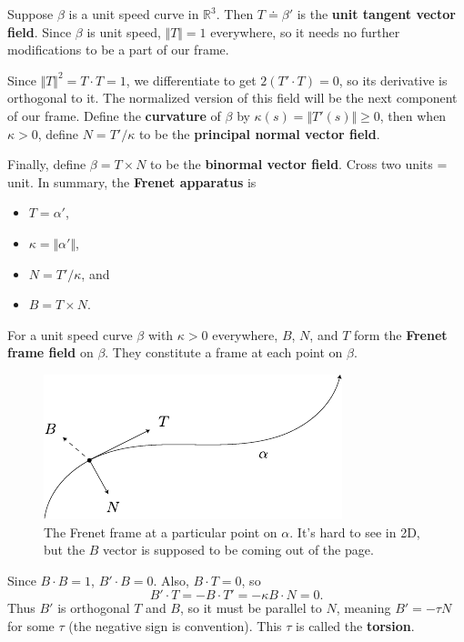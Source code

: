 \documentclass[10pt]{report}
\begin{document}
Suppose $\beta$ is a unit speed curve in $\mathbb{R}^3$. Then $T\doteq\beta'$ is the \textbf{unit tangent vector field}. Since $\beta$ is unit speed, $\Vert{T}\Vert=1$ everywhere, so it needs no further modifications to be a part of our frame.

Since $\Vert{T}\Vert^2 = T\cdot T=1$, we differentiate to get $2(T'\cdot T)=0$, so its derivative is orthogonal to it. The normalized version of this field will be the next component of our frame. Define the \textbf{curvature} of $\beta$ by $\kappa(s) = \Vert{T'(s)}\Vert\geq 0$, then when $\kappa > 0$, define $N = T' / \kappa$ to be the \textbf{principal normal vector field}.

Finally, define $\beta = T \times N$ to be the \textbf{binormal vector field}. {\color{red}Cross two units = unit.} In summary, the \textbf{Frenet apparatus} is
\begin{itemize}
	\item $T=\alpha'$,
	\item $\kappa = \Vert{\alpha'}\Vert$,
	\item $N = T' / \kappa$, and
	\item $B = T \times N$.
\end{itemize}
\begin{defn}[]
	For a unit speed curve $\beta$ with $\kappa>0$ everywhere, $B$, $N$, and $T$ form the \textbf{Frenet frame field} on $\beta$. They constitute a frame at each point on $\beta$.
\end{defn}

\begin{figure}[H]
	\centering
	\includegraphics[scale=1.5]{fig/frenet.pdf}
	\caption{The Frenet frame at a particular point on $\alpha$. It's hard to see in 2D, but the $B$ vector is supposed to be coming out of the page.}
\end{figure}

Since $B \cdot B=1$, $B' \cdot B = 0$. Also, $B \cdot T = 0$, so
	\[
	B' \cdot T = -B \cdot T' = -\kappa B \cdot N = 0.
	\]
	Thus $B'$ is orthogonal $T$ and $B$, so it must be parallel to $N$, meaning $B' = -\tau N$ for some $\tau$ (the negative sign is convention). This $\tau$ is called the \textbf{torsion}.
\end{document}
